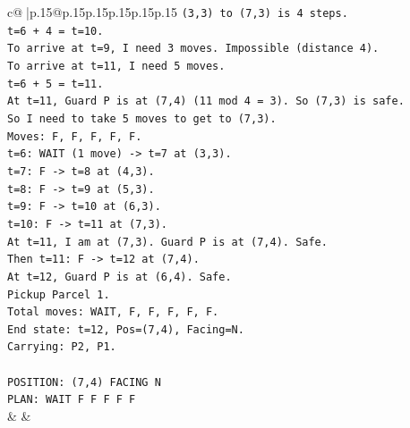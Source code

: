 \documentclass{article}
\begin{document}
{\begin{supertabular}{c@{$\;$}|p{.15\linewidth}@{}p{.15\linewidth}p{.15\linewidth}p{.15\linewidth}p{.15\linewidth}p{.15\linewidth}}
{{{\texttt{(3,3) to (7,3) is 4 steps.} \\
\texttt{t=6 + 4 = t=10.} \\
\texttt{To arrive at t=9, I need 3 moves. Impossible (distance 4).} \\
\texttt{To arrive at t=11, I need 5 moves.} \\
\texttt{t=6 + 5 = t=11.} \\
\texttt{At t=11, Guard P is at (7,4) (11 mod 4 = 3). So (7,3) is safe.} \\
\texttt{So I need to take 5 moves to get to (7,3).} \\
\texttt{Moves: F, F, F, F, F.} \\
\texttt{t=6: WAIT (1 move) {-}> t=7 at (3,3).} \\
\texttt{t=7: F {-}> t=8 at (4,3).} \\
\texttt{t=8: F {-}> t=9 at (5,3).} \\
\texttt{t=9: F {-}> t=10 at (6,3).} \\
\texttt{t=10: F {-}> t=11 at (7,3).} \\
\texttt{At t=11, I am at (7,3). Guard P is at (7,4). Safe.} \\
\texttt{Then t=11: F {-}> t=12 at (7,4).} \\
\texttt{At t=12, Guard P is at (6,4). Safe.} \\
\texttt{Pickup Parcel 1.} \\
\texttt{Total moves: WAIT, F, F, F, F, F.} \\
\texttt{End state: t=12, Pos=(7,4), Facing=N.} \\
\texttt{Carrying: P2, P1.} \\
\\ 
\texttt{POSITION: (7,4) FACING N} \\
\texttt{PLAN: WAIT F F F F F} \\
            }
        }
    }
    & & \\ \\


\end{supertabular}}
\end{document}

